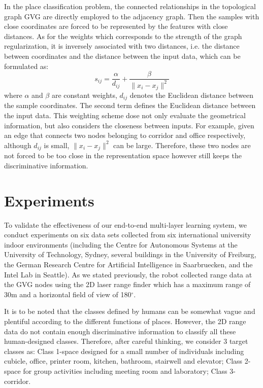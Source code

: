\documentclass[letterpaper, 10 pt, conference]{ieeeconf}  %
\begin{document}
In the place classification problem, the connected relationships in the topological graph GVG are directly employed to the adjacency graph. Then the samples with close coordinates are forced to be represented by the features with close distances. As for the weights which corresponds to the strength of the graph regularization, it is inversely associated with two distances, i.e. the distance between coordinates and the distance between the input data, which can be formulated as:
\begin{equation}\label{sij}
    s_{ij} =  \frac{\alpha}{d_{ij}} +  \frac{\beta}{\|x_i-x_j\|^2}
\end{equation}
where $\alpha$ and $\beta$ are constant weights, $d_{ij}$ denotes the Euclidean distance between the sample coordinates. The second term defines the Euclidean distance between the input data. This weighting scheme dose not only evaluate the geometrical information, but also considers the closeness between inputs. For example, given an edge that connects two nodes belonging to corridor and office respectively, although $d_{ij}$ is small, $\|x_i-x_j\|^2$ can be large. Therefore, these two nodes are not forced to be too close in the representation space however still keeps the discriminative information.







\section{Experiments} \label{secExp}

To validate the effectiveness of our end-to-end multi-layer learning system, we conduct experiments on six data sets collected from six international university indoor environments (including the Centre for Autonomous Systems at the University of Technology, Sydney, several buildings in the University of Freiburg, the German Research Centre for Artificial Intelligence in Saarbruecken, and the Intel Lab in Seattle). As we stated previously, the robot collected range data at the GVG nodes using the 2D laser range finder which has a maximum range of 30m and a horizontal field of view of 180$^\circ$.

It is to be noted that the classes defined by humans can be somewhat vague and plentiful according to the different functions of places. However, the 2D range data do not contain enough discriminative information to classify all these human-designed classes.  Therefore, after careful thinking, we consider 3 target classes as: Class 1-space designed for a small number of individuals including cubicle, office, printer room, kitchen, bathroom, stairwell and elevator; Class 2-space for group activities including meeting room and laboratory; Class 3-corridor.
\end{document}

